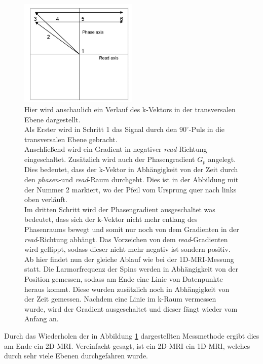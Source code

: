\begin{figure}[H]
    \centering
    \includegraphics[width = 0.5\textwidth]{Abbildungen/2DMRI.JPG}
    \caption[Veranschaulichter Verlauf des k-Vektors im 2D-MRI]{Hier wird anschaulich ein Verlauf des k-Vektors in der transversalen Ebene dargestellt.\\
    Als Erster wird in Schritt 1 das Signal durch den $90^{\circ}$-Puls in die transversalen Ebene gebracht.\\
    Anschließend wird ein Gradient in negativer \textit{read}-Richtung eingeschaltet. Zusätzlich wird auch der Phasengradient $G_p$ angelegt. Dies bedeutet, dass der k-Vektor in Abhängigkeit von der Zeit durch den \textit{phasen}-und \textit{read}-Raum durchgeht. Dies ist in der Abbildung mit der Nummer 2 markiert, wo der Pfeil vom Ursprung quer nach links oben verläuft.\\
    Im dritten Schritt wird der Phasengradient ausgeschaltet was bedeutet, dass sich der k-Vektor nicht mehr entlang des Phasenraums bewegt und somit nur noch von dem Gradienten in der \textit{read}-Richtung abhängt. Das Vorzeichen von dem \textit{read}-Gradienten wird geflippt, sodass dieser nicht mehr negativ ist sondern positiv. Ab hier findet nun der gleiche Ablauf wie bei der 1D-MRI-Messung statt. Die Larmorfrequenz der Spins werden in Abhängigkeit von der Position gemessen, sodass am Ende eine Linie von Datenpunkte heraus kommt. Diese wurden  zusätzlich noch in Abhängigkeit von der Zeit gemessen. Nachdem eine Linie im k-Raum vermessen wurde, wird der Gradient ausgeschaltet und dieser fängt wieder vom Anfang an.\\ \cite{Schmidt}}
    \label{fig:2DMRIk}
\end{figure}
Durch das Wiederholen der in Abbildung \ref{fig:2DMRIk} dargestellten Messmethode ergibt dies am Ende ein 2D-MRI. Vereinfacht gesagt, ist ein 2D-MRI ein 1D-MRI, welches durch sehr viele Ebenen durchgefahren wurde.


